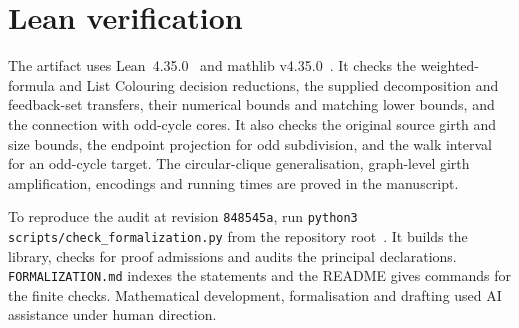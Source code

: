\documentclass[11pt]{article}
\theoremstyle{remark}
\begin{document}
\section{Lean verification}\label{app:lean}
The artifact uses Lean~4.35.0~\cite{deMouraUllrich2021} and
mathlib v4.35.0~\cite{mathlib2020}. It checks the weighted-formula and
List Colouring decision reductions, the supplied decomposition and
feedback-set transfers, their numerical bounds and matching lower bounds,
and the connection with odd-cycle cores. It also checks the original
source girth and size bounds, the endpoint projection for odd subdivision,
and the walk interval for an odd-cycle target. The circular-clique
generalisation, graph-level girth amplification, encodings and running
times are proved in the manuscript.

To reproduce the audit at revision \texttt{848545a}, run
\texttt{python3 scripts/check\_formalization.py} from the repository
root~\cite{artifact}. It builds the library, checks for proof admissions
and audits the principal declarations. \texttt{FORMALIZATION.md} indexes
the statements and the README gives commands for the finite checks.
Mathematical development, formalisation and drafting used AI assistance
under human direction.
\end{document}
